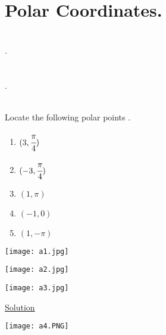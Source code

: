 \section{Polar Coordinates.}
\\
.\\ \\
\\
.\\ \\
\noindent{\color{smalt(darkpowderblue)}\rule{\linewidth}{.2mm}}
\begin{example}
Locate the following polar points .
\begin{enumerate}
    \item $(3,\cfrac{\pi}{4}) $
    \item $(-3,\cfrac{\pi}{4})$
    \item $(1,\pi)$
    \item $(-1,0)$
    \item $(1,-\pi)$
\end{enumerate}
\begin{minipage}{0.3\textwidth}
\texttt{[image: a1.jpg]}
\end{minipage}
\begin{minipage}{.3\textwidth}
\texttt{[image: a2.jpg]}
\end{minipage}
\hfill
\begin{minipage}{.3\textwidth}
\texttt{[image: a3.jpg]}
\end{minipage}
\begin{minipage}{0.5\textwidth}
\underline{\textbf{\large}\color{smalt(darkpowderblue)}Solution} \\
\end{minipage}
\begin{minipage}{.5\textwidth}
\texttt{[image: a4.PNG]}
\end{minipage} \\
\end{example}
